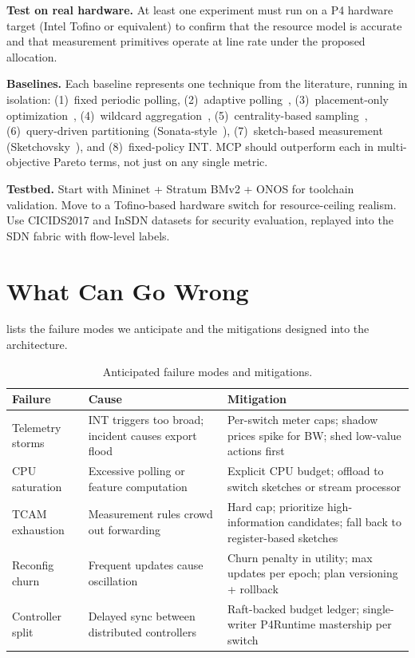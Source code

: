 \documentclass[letterpaper,twocolumn,10pt]{article}
\newcommand{\system}{MCP\xspace}
\newcommand{\para}[1]{\smallskip\noindent\textbf{#1.}}
\begin{document}
\para{Test on real hardware}
At least one experiment must run on a P4 hardware target (Intel
Tofino or equivalent) to confirm that the resource model is
accurate and that measurement primitives operate at line rate
under the proposed allocation.

\para{Baselines}
Each baseline represents one technique from the literature,
running in isolation: (1)~fixed periodic polling, (2)~adaptive
polling~\cite{adrichem2014opennetmon}, (3)~placement-only
optimization~\cite{su2014flowcover}, (4)~wildcard
aggregation~\cite{xu2017wildcard}, (5)~centrality-based
sampling~\cite{yoon2017sampling}, (6)~query-driven partitioning
(Sonata-style~\cite{gupta2018sonata}), (7)~sketch-based
measurement
(Sketchovsky~\cite{namkung2023sketchovsky}), and (8)~fixed-policy
INT. \system should outperform each in multi-objective Pareto
terms, not just on any single metric.

\para{Testbed}
Start with Mininet + Stratum BMv2 + ONOS for toolchain
validation. Move to a Tofino-based hardware switch for
resource-ceiling realism. Use CICIDS2017 and InSDN datasets for
security evaluation, replayed into the SDN fabric with
flow-level labels.

\section{What Can Go Wrong}
\label{sec:failures}

 lists the failure modes we anticipate and the
mitigations designed into the architecture.

\begin{table}[t]
  \caption{Anticipated failure modes and mitigations.}
  \label{tab:failures}
  \centering
  \footnotesize
  \begin{tabular}{@{}p{1.6cm}p{2.2cm}p{2.6cm}@{}}
    \toprule
    Failure & Cause & Mitigation \\
    \midrule
    Telemetry storms &
      INT triggers too broad; incident causes export flood &
      Per-switch meter caps; shadow prices spike for BW;
      shed low-value actions first \\
    \addlinespace
    CPU saturation &
      Excessive polling or feature computation &
      Explicit CPU budget; offload to switch sketches or stream
      processor \\
    \addlinespace
    TCAM exhaustion &
      Measurement rules crowd out forwarding &
      Hard cap; prioritize high-information candidates;
      fall back to register-based sketches \\
    \addlinespace
    Reconfig churn &
      Frequent updates cause oscillation &
      Churn penalty in utility; max updates per epoch;
      plan versioning + rollback \\
    \addlinespace
    Controller split &
      Delayed sync between distributed controllers &
      Raft-backed budget ledger; single-writer P4Runtime
      mastership per switch \\
    \bottomrule
  \end{tabular}
\end{table}
\end{document}
